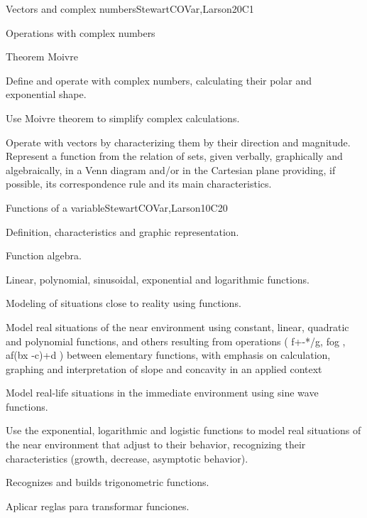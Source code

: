 \begin{syllabus}
\begin{unit}{Vectors and complex numbers}{}{StewartCOVar,Larson}{20}{C1}
   \begin{topics}
      \item Operations with complex numbers
      \item Theorem Moivre
   \end{topics}

   \begin{learningoutcomes}
      \item  Define and operate with complex numbers, calculating their polar and exponential shape.
      \item  Use Moivre theorem to simplify complex calculations.
      \item Operate with vectors by characterizing them by their direction and magnitude.  Represent a function from the relation of sets, given verbally, graphically and algebraically, in a Venn diagram and/or in the Cartesian plane providing, if possible, its correspondence rule and its main characteristics.
   \end{learningoutcomes}
\end{unit}

\begin{unit}{Functions of a variable}{}{StewartCOVar,Larson}{10}{C20}
   \begin{topics}
      \item Definition, characteristics and graphic representation.
      \item Function algebra.
      \item Linear, polynomial, sinusoidal, exponential and logarithmic functions.
      \item Modeling of situations close to reality using functions.
   \end{topics}

   \begin{learningoutcomes}
      \item Model real situations of the near environment using constant, linear, quadratic and polynomial functions, and others resulting from operations ( f+-*/g, fog , af(bx -c)+d ) between elementary functions, with emphasis on calculation, graphing and interpretation of slope and concavity in an applied context 
      \item Model real-life situations in the immediate environment using sine wave functions.
      \item Use the exponential, logarithmic and logistic functions to model real situations of the near environment that adjust to their behavior, recognizing their characteristics (growth, decrease, asymptotic behavior).
      \item Recognizes and builds trigonometric functions.
      \item Aplicar reglas para transformar funciones.
   \end{learningoutcomes}
\end{unit}


\end{syllabus}
